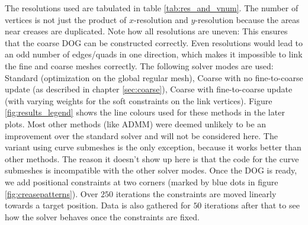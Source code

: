 \documentclass[a4paper,twoside,12pt,nochapterprefix]{scrbook}
\begin{document}
The resolutions used are tabulated in table \ref{tab:res_and_vnum}. The number of vertices is not just the product of $x$-resolution and $y$-resolution because the areas near creases are duplicated. Note how all resolutions are uneven: This ensures that the coarse DOG can be constructed correctly. Even resolutions would lead to an odd number of edges/quads in one direction, which makes it impossible to link the fine and coarse meshes correctly.\newline
The following solver modes are used: Standard (optimization on the global regular mesh), Coarse with no fine-to-coarse update (as described in chapter \ref{sec:coarse}), Coarse with fine-to-coarse update (with varying weights for the soft constraints on the link vertices). Figure \ref{fig:results_legend} shows the line colours used for these methods in the later plots.\newline
Most other methods (like ADMM) were deemed unlikely to be an improvement over the standard solver and will not be considered here. The variant using curve submeshes is the only exception, because it works better than other methods. The reason it doesn't show up here is that the code for the curve submeshes is incompatible with the other solver modes.\newline
Once the DOG is ready, we add positional constraints at two corners (marked by blue dots in figure \ref{fig:creasepatterns}). Over $250$ iterations the constraints are moved linearly towards a target position. Data is also gathered for $50$ iterations after that to see how the solver behaves once the constraints are fixed.\newline
\end{document}
